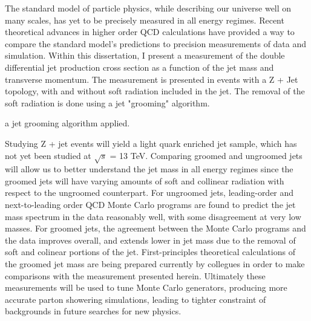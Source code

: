 
The standard model of particle physics, while describing our universe well on many scales, has yet to be precisely measured in all energy regimes. Recent theoretical advances in higher order QCD calculations have provided a way to compare the standard model's predictions to precision measurements of data and simulation. Within this dissertation, I present a measurement of the double differential jet production cross section as a function of the jet mass and transverse momentum. The measurement is presented in events with a Z + Jet topology, with and without soft radiation included in the jet. The removal of the soft radiation is done using a jet "grooming" algorithm.

 a jet grooming algorithm applied.

Studying Z + jet events will yield a light quark enriched jet sample, which has not yet been studied at $\sqrt{s}$ = 13 TeV. Comparing groomed and ungroomed jets will allow us to better understand the jet mass in all energy regimes since the groomed jets will have varying amounts of soft and collinear radiation with respect to the ungroomed counterpart. For ungroomed jets, leading-order and next-to-leading order QCD Monte Carlo programs are found to predict the jet mass spectrum in the data reasonably well, with some disagreement at very low masses. For groomed jets, the agreement between the Monte Carlo programs and the data improves overall, and extends lower in jet mass due to the removal of soft and colinear portions of the jet. First-principles theoretical calculations of the groomed jet mass are being prepared currently by collegues in order to make comparisons with the measurement presented herein. Ultimately these measurements will be used to tune Monte Carlo generators, producing more accurate parton showering simulations, leading to tighter constraint of backgrounds in future searches for new physics.
